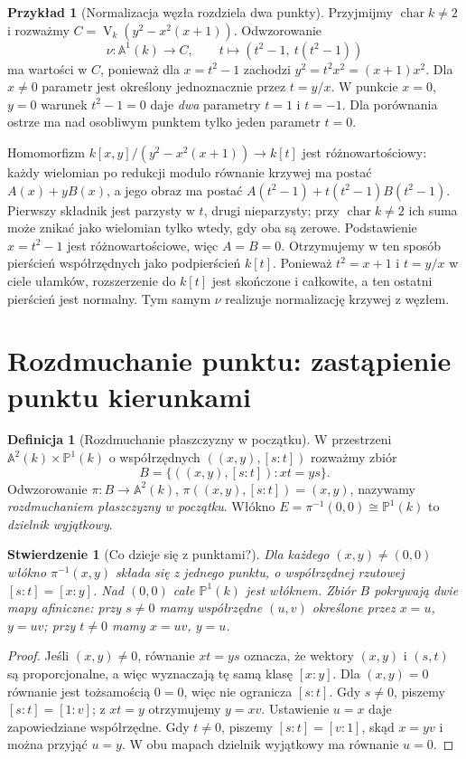 \documentclass[11pt,a4paper,openany]{report}
\numberwithin{equation}{section}
\theoremstyle{plain}
\newtheorem{stwierdzenie}[twierdzenie]{Stwierdzenie}
\theoremstyle{definition}
\newtheorem{definicja}[twierdzenie]{Definicja}
\newtheorem{przyklad}[twierdzenie]{Przykład}
\theoremstyle{remark}
\newcommand{\A}{\mathbb A}
\newcommand{\PP}{\mathbb P}
\newcommand{\V}{\operatorname V}
\begin{document}
\begin{przyklad}[Normalizacja węzła rozdziela dwa punkty]
\label{pr:node-normalization}
Przyjmijmy $\operatorname{char}k\ne2$ i rozważmy
$C=\V_k(y^2-x^2(x+1))$. Odwzorowanie
\[
 \nu:\A^1(k)\to C,\qquad
 t\longmapsto(t^2-1,\ t(t^2-1))
\]
ma wartości w $C$, ponieważ dla $x=t^2-1$ zachodzi
$y^2=t^2x^2=(x+1)x^2$.
Dla $x\ne0$ parametr jest określony jednoznacznie
przez $t=y/x$. W punkcie $x=0$, $y=0$
warunek $t^2-1=0$ daje \emph{dwa} parametry $t=1$ i $t=-1$.
Dla porównania ostrze ma nad osobliwym punktem tylko
jeden parametr $t=0$.

Homomorfizm $k[x,y]/(y^2-x^2(x+1))\to k[t]$
jest różnowartościowy: każdy wielomian po redukcji modulo
równanie krzywej ma postać $A(x)+yB(x)$, a jego obraz
ma postać $A(t^2-1)+t(t^2-1)B(t^2-1)$.
Pierwszy składnik jest parzysty w $t$, drugi nieparzysty;
przy $\operatorname{char}k\ne2$ ich suma może znikać
jako wielomian tylko wtedy, gdy oba są zerowe.
Podstawienie $x=t^2-1$ jest różnowartościowe, więc
$A=B=0$. Otrzymujemy w ten sposób pierścień współrzędnych
jako podpierścień $k[t]$.
Ponieważ $t^2=x+1$ i $t=y/x$ w ciele ułamków,
rozszerzenie do $k[t]$ jest skończone i całkowite,
a ten ostatni pierścień jest normalny. Tym samym
$\nu$ realizuje normalizację krzywej z węzłem.
\end{przyklad}

\section{Rozdmuchanie punktu: zastąpienie punktu kierunkami}

\begin{definicja}[Rozdmuchanie płaszczyzny w początku]
\label{def:blowup-plane}
W przestrzeni $\A^2(k)\times\PP^1(k)$
o współrzędnych $((x,y),[s:t])$ rozważmy zbiór
\[
 B=\{((x,y),[s:t]):xt=ys\}.
\]
Odwzorowanie $\pi:B\to\A^2(k)$,
$\pi((x,y),[s:t])=(x,y)$, nazywamy
\emph{rozdmuchaniem płaszczyzny w początku}.
Włókno $E=\pi^{-1}(0,0)\cong\PP^1(k)$ to
\emph{dzielnik wyjątkowy}.
\end{definicja}

\begin{stwierdzenie}[Co dzieje się z punktami?]
Dla każdego $(x,y)\ne(0,0)$ włókno
$\pi^{-1}(x,y)$ składa się z jednego punktu,
o współrzędnej rzutowej $[s:t]=[x:y]$.
Nad $(0,0)$ całe $\PP^1(k)$ jest włóknem.
Zbiór $B$ pokrywają dwie mapy afiniczne:
przy $s\ne0$ mamy współrzędne $(u,v)$ określone przez
$x=u$, $y=uv$; przy $t\ne0$ mamy
$x=uv$, $y=u$.
\end{stwierdzenie}
\begin{proof}
Jeśli $(x,y)\ne0$, równanie $xt=ys$ oznacza,
że wektory $(x,y)$ i $(s,t)$ są proporcjonalne,
a więc wyznaczają tę samą klasę $[x:y]$.
Dla $(x,y)=0$ równanie jest tożsamością $0=0$,
więc nie ogranicza $[s:t]$.
Gdy $s\ne0$, piszemy $[s:t]=[1:v]$;
z $xt=y$ otrzymujemy $y=xv$. Ustawienie $u=x$
daje zapowiedziane współrzędne. Gdy $t\ne0$, piszemy
$[s:t]=[v:1]$, skąd $x=yv$ i można przyjąć $u=y$.
W obu mapach dzielnik wyjątkowy ma równanie $u=0$.
\end{proof}
\end{document}
